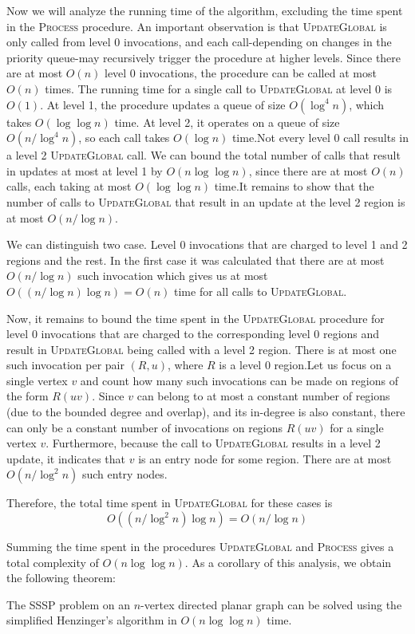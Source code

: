Now we will analyze the running time of the algorithm, excluding the time spent in the \textsc{Process} procedure. An important observation is that \textsc{UpdateGlobal} is only called from level 0 invocations, and each call-depending on changes in the priority queue-may recursively trigger the procedure at higher levels. Since there are at most $O(n)$ level 0 invocations, the procedure can be called at most $O(n)$ times. The running time for a single call to \textsc{UpdateGlobal} at level 0 is $O(1)$. At level 1, the procedure updates a queue of size $O(\log^4 n)$, which takes $O(\log \log n)$ time. At level 2, it operates on a queue of size $O(n / \log^4 n)$, so each call takes $O(\log n)$ time.Not every level 0 call results in a level 2 \textsc{UpdateGlobal} call. We can bound the total number of calls that result in updates at most at level 1 by $O(n \log \log n)$, since there are at most $O(n)$ calls, each taking at most $O(\log \log n)$ time.It remains to show that the number of calls to \textsc{UpdateGlobal} that result in an update at the level 2 region is at most $O(n / \log n)$.

We can distinguish two case. Level 0 invocations that are charged to level 1 and 2 regions and the rest. In the first case it was calculated that there are at most $O(n/\log n)$ such invocation which gives us at most $O((n/\log n)\log n) = O(n)$ time for all calls to \textsc{UpdateGlobal}.

Now, it remains to bound the time spent in the \textsc{UpdateGlobal} procedure for level 0 invocations that are charged to the corresponding level 0 regions and result in \textsc{UpdateGlobal} being called with a level 2 region. There is at most one such invocation per pair $(R, u)$, where $R$ is a level 0 region.Let us focus on a single vertex $v$ and count how many such invocations can be made on regions of the form $R(uv)$. Since $v$ can belong to at most a constant number of regions (due to the bounded degree and overlap), and its in-degree is also constant, there can only be a constant number of invocations on regions $R(uv)$ for a single vertex $v$. Furthermore, because the call to \textsc{UpdateGlobal} results in a level 2 update, it indicates that $v$ is an entry node for some region. There are at most $O(n/\log^2 n)$ such entry nodes.

Therefore, the total time spent in \textsc{UpdateGlobal} for these cases is
$$O((n/\log^2n) \log n) = O(n/\log n)$$

Summing the time spent in the procedures \textsc{UpdateGlobal} and \textsc{Process} gives a total complexity of $O(n \log \log n)$. As a corollary of this analysis, we obtain the following theorem:

\begin{theorem}
The SSSP problem on an $n$-vertex directed planar graph can be solved using the simplified Henzinger's algorithm in $O(n \log \log n)$ time.
\end{theorem}


